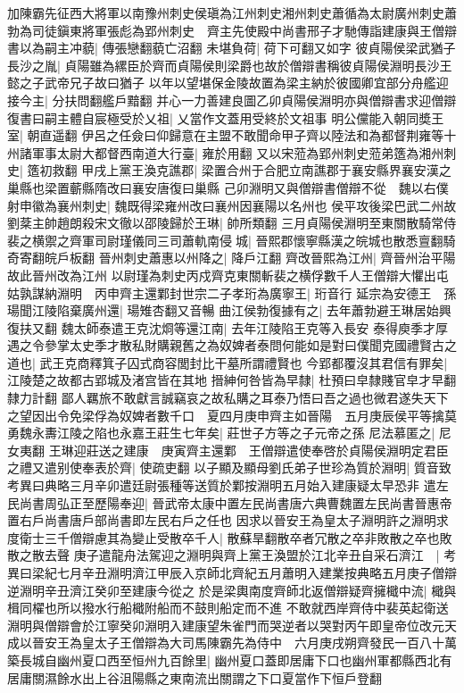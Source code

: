 加陳霸先征西大將軍以南豫州刺史侯瑱為江州刺史湘州刺史蕭循為太尉廣州刺史蕭勃為司徒鎭東將軍張彪為郢州刺史　齊主先使殿中尚書邢子才馳傳詣建康與王僧辯書以為嗣主冲藐|{
	傳張戀翻藐亡沼翻}
未堪負荷|{
	荷下可翻又如字}
彼貞陽侯梁武猶子長沙之胤|{
	貞陽雖為縲臣於齊而貞陽侯則梁爵也故於僧辯書稱彼貞陽侯淵明長沙王懿之子武帝兄子故曰猶子}
以年以望堪保金陵故置為梁主納於彼國卿宜部分舟艦迎接今主|{
	分扶問翻艦戶黯翻}
并心一力善建良圖乙卯貞陽侯淵明亦與僧辯書求迎僧辯復書曰嗣主體自宸極受於乂祖|{
	乂當作文蓋用受終於文祖事}
明公儻能入朝同奬王室|{
	朝直遥翻}
伊呂之任僉曰仰歸意在主盟不敢聞命甲子齊以陸法和為都督荆雍等十州諸軍事太尉大都督西南道大行臺|{
	雍於用翻}
又以宋蒞為郢州刺史蒞弟簉為湘州刺史|{
	簉初救翻}
甲戌上黨王渙克譙郡|{
	梁置合州于合肥立南譙郡于襄安縣界襄安漢之巢縣也梁置蘄縣隋改曰襄安唐復曰巢縣}
己卯淵明又與僧辯書僧辯不從　魏以右僕射申徽為襄州刺史|{
	魏既得梁雍州改曰襄州因襄陽以名州也}
侯平攻後梁巴武二州故劉棻主帥趙朗殺宋文徹以邵陵歸於王琳|{
	帥所類翻}
三月貞陽侯淵明至東關散騎常侍裴之横禦之齊軍司尉瑾儀同三司蕭軌南侵城|{
	晉熙郡懷寧縣漢之皖城也散悉亶翻騎奇寄翻皖戶板翻}
晉州刺史蕭惠以州降之|{
	降戶江翻}
齊改晉熙為江州|{
	齊晉州治平陽故此晉州改為江州}
以尉瑾為刺史丙戍齊克東關斬裴之横俘數千人王僧辯大懼出屯姑孰謀納淵明　丙申齊主還鄴封世宗二子孝珩為廣寧王|{
	珩音行}
延宗為安德王　孫瑒聞江陵陷棄廣州還|{
	瑒雉杏翻又音暢}
曲江侯勃復據有之|{
	去年蕭勃避王琳居始興復扶又翻}
魏太師泰遣王克沈烱等還江南|{
	去年江陵陷王克等入長安}
泰得庾季才厚遇之令參掌太史季才散私財購親舊之為奴婢者泰問何能如是對曰僕聞克國禮賢古之道也|{
	武王克商釋箕子囚式商容閭封比干墓所謂禮賢也}
今郢都覆沒其君信有罪矣|{
	江陵楚之故都古郢城及渚宫皆在其地}
搢紳何咎皆為早隸|{
	杜預曰皁隸賤官皁才早翻隸力計翻}
鄙人羈旅不敢獻言誠竊哀之故私購之耳泰乃悟曰吾之過也微君遂失天下之望因出令免梁俘為奴婢者數千口　夏四月庚申齊主如晉陽　五月庚辰侯平等擒莫勇魏永夀江陵之陷也永嘉王莊生七年矣|{
	莊世子方等之子元帝之孫}
尼法慕匿之|{
	尼女夷翻}
王琳迎莊送之建康　庚寅齊主還鄴　王僧辯遣使奉啓於貞陽侯淵明定君臣之禮又遣别使奉表於齊|{
	使疏吏翻}
以子顯及顯母劉氏弟子世珍為質於淵明|{
	質音致　考異曰典略三月辛卯遣廷尉張種等送質於鄴按淵明五月始入建康疑太早恐非}
遣左民尚書周弘正至歷陽奉迎|{
	晉武帝太康中置左民尚書唐六典曹魏置左民尚書晉惠帝置右戶尚書唐戶部尚書即左民右戶之任也}
因求以晉安王為皇太子淵明許之淵明求度衛士三千僧辯慮其為變止受散卒千人|{
	散蘇旱翻散卒者冗散之卒非敗散之卒也敗散之散去聲}
庚子遣龍舟法駕迎之淵明與齊上黨王渙盟於江北辛丑自采石濟江　|{
	考異曰梁紀七月辛丑淵明濟江甲辰入京師北齊紀五月蕭明入建業按典略五月庚子僧辯逆淵明辛丑濟江癸卯至建康今從之}
於是梁輿南度齊師北返僧辯疑齊擁檝中流|{
	檝與楫同櫂也所以撥水行船檝附船而不鼓則船定而不進}
不敢就西岸齊侍中裴英起衛送淵明與僧辯會於江寧癸卯淵明入建康望朱雀門而哭逆者以哭對丙午即皇帝位改元天成以晉安王為皇太子王僧辯為大司馬陳霸先為侍中　六月庚戌朔齊發民一百八十萬築長城自幽州夏口西至恒州九百餘里|{
	幽州夏口蓋即居庸下口也幽州軍都縣西北有居庸關濕餘水出上谷沮陽縣之東南流出關謂之下口夏當作下恒戶登翻}
